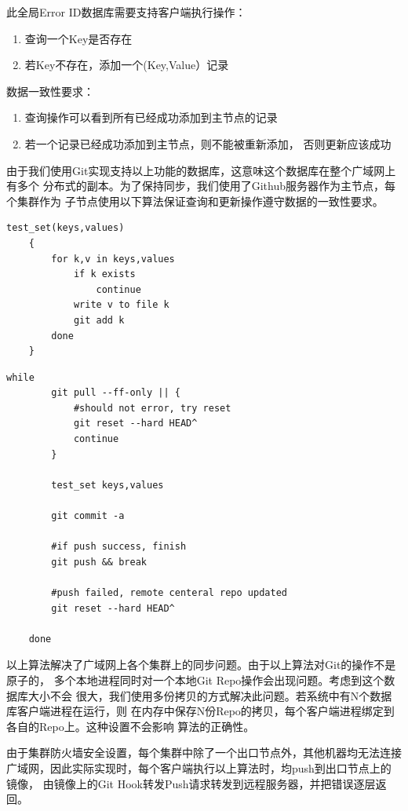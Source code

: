 \documentclass[a4paper]{article}
\begin{document}
此全局Error ID数据库需要支持客户端执行操作：
\begin{enumerate}
	\item 查询一个Key是否存在
	\item 若Key不存在，添加一个(Key,Value）记录
\end{enumerate}

数据一致性要求：

\begin{enumerate}
	\item 查询操作可以看到所有已经成功添加到主节点的记录
	\item 若一个记录已经成功添加到主节点，则不能被重新添加，
		否则更新应该成功
\end{enumerate}

由于我们使用Git实现支持以上功能的数据库，这意味这个数据库在整个广域网上有多个
分布式的副本。为了保持同步，我们使用了Github服务器作为主节点，每个集群作为
子节点使用以下算法保证查询和更新操作遵守数据的一致性要求。

\begin{Verbatim}[frame=single]
	test_set(keys,values)
	{
		for k,v in keys,values
			if k exists
				continue
			write v to file k
			git add k
		done
	}
\end{Verbatim}

\begin{Verbatim}[frame=single]
	while
		git pull --ff-only || {
			#should not error, try reset
			git reset --hard HEAD^
			continue
		}

		test_set keys,values

		git commit -a

		#if push success, finish
		git push && break

		#push failed, remote centeral repo updated
		git reset --hard HEAD^

	done
\end{Verbatim}

以上算法解决了广域网上各个集群上的同步问题。由于以上算法对Git的操作不是原子的，
多个本地进程同时对一个本地Git Repo操作会出现问题。考虑到这个数据库大小不会
很大，我们使用多份拷贝的方式解决此问题。若系统中有N个数据库客户端进程在运行，则
在内存中保存N份Repo的拷贝，每个客户端进程绑定到各自的Repo上。这种设置不会影响
算法的正确性。

由于集群防火墙安全设置，每个集群中除了一个出口节点外，其他机器均无法连接
广域网，因此实际实现时，每个客户端执行以上算法时，均push到出口节点上的镜像，
由镜像上的Git Hook转发Push请求转发到远程服务器，并把错误逐层返回。
\end{document}
